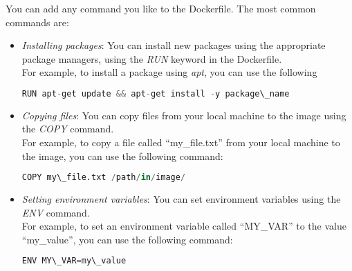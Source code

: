 You can add any command you like to the Dockerfile. The most common commands
are:
\begin{itemize}
  \item \textit{Installing packages}: You can install new packages using the
  appropriate package managers, using the \textit{RUN} keyword in the Dockerfile. \\
  For example, to install a package using \textit{apt}, you can use the following

\begin{lstlisting}[language=python]
  RUN apt-get update && apt-get install -y package\_name
\end{lstlisting}

  \item \textit{Copying files}: You can copy files from your local machine to the
  image using the \textit{COPY} command. \\
  For example, to copy a file called ``my\_file.txt'' from your local machine
  to the image, you can use the following command:
\begin{lstlisting}[language=python]
  COPY my\_file.txt /path/in/image/
\end{lstlisting}

  \item \textit{Setting environment variables}: You can set environment
  variables using the \textit{ENV} command. \\
  For example, to set an environment variable called ``MY\_VAR'' to the value
  ``my\_value'', you can use the following command:
\begin{lstlisting}[language=python]
  ENV MY\_VAR=my\_value
\end{lstlisting}

\end{itemize}
